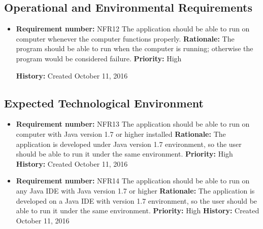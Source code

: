\documentclass[12pt,letterpaper]{article}
\begin{document}
\subsection{Operational and Environmental Requirements}
\begin{reqbox}
	\begin{itemize}
\subsubsection{Expected Physical Environment}
	\item \textbf{Requirement number: }NFR12
	The application should be able to run on computer whenever the computer functions properly.
	\textbf{Rationale: }The program should be able to run when the computer is running; otherwise the program would be considered failure.
	\textbf{Priority: }High
	
	\textbf{History: }Created October 11, 2016
	\end{itemize}
\end{reqbox}
\subsection{Expected Technological Environment}
\begin{reqbox}
	\begin{itemize}
	\item \textbf{Requirement number: }NFR13
	The application should be able to run on computer with Java version 1.7 or higher installed
	\textbf{Rationale: }The application is developed under Java version 1.7 environment, so the user should be able to run it under the same environment. 
	\textbf{Priority: }High
	\textbf{History: }Created October 11, 2016
	\end{itemize}
\end{reqbox}
\begin{reqbox}
	\begin{itemize}
\subsubsection{Partner Application}
	\item \textbf{Requirement number: }NFR14
	The application should be able to run on any Java IDE with Java version 1.7 or higher
	\textbf{Rationale: }The application is developed on a Java IDE with version 1.7 environment, so the user should be able to run it under the same environment. 
	\textbf{Priority: }High
	\textbf{History: }Created October 11, 2016
	\end{itemize}
\end{reqbox}
\end{document}
